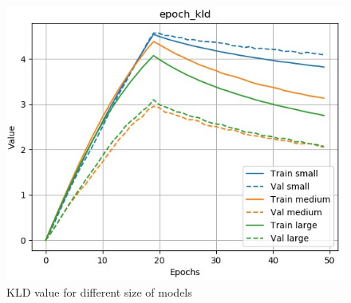 \documentclass[12pt]{report}
\begin{document}
\begin{figure}[htbp]
\begin{minipage}{0.5 \textwidth}
\begin{center}
            \includegraphics[width=\textwidth]{images/experiences/size/kld-comparison-size.jpg}
            \caption{KLD value for different size of models}
            \label{fig:kld-comparison-size}
        \end{center}
    \end{minipage}
\end{figure}
\end{document}
